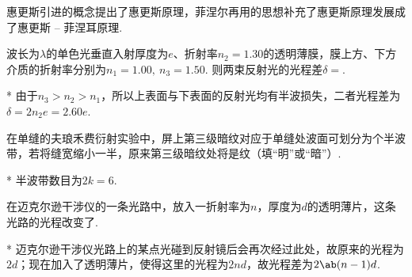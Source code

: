 \begin{problem}[惠更斯原理][4]
    惠更斯引进的概念提出了惠更斯原理，菲涅尔再用的思想补充了惠更斯原理发展成了惠更斯 -- 菲涅耳原理.
\end{problem}

\begin{problem}[增透膜][2]
    波长为$\lambda$的单色光垂直入射厚度为$e$、折射率$n_2=1.30$的透明薄膜，膜上方、下方介质的折射率分别为$n_1=1.00,\ n_3=1.50$. 则两束反射光的光程差$\delta=$.
\end{problem}
\begin{solution}*
    由于$n_3>n_2>n_1$，所以上表面与下表面的反射光均有半波损失，二者光程差为$\delta=2n_2e=2.60e$.
\end{solution}

\begin{problem}[弗琅禾费衍射][4]
    在单缝的夫琅禾费衍射实验中，屏上第三级暗纹对应于单缝处波面可划分为个半波带，若将缝宽缩小一半，原来第三级暗纹处将是纹（填“明”或“暗”）.
\end{problem}
\begin{solution}*
    半波带数目为$2k=6$.
\end{solution}

\begin{problem}[迈克尔逊干涉仪][3]
    在迈克尔逊干涉仪的一条光路中，放入一折射率为$n$，厚度为$d$的透明薄片，这条光路的光程改变了.
\end{problem}
\begin{solution}*
    迈克尔逊干涉仪光路上的某点光碰到反射镜后会再次经过此处，故原来的光程为$2d$；现在加入了透明薄片，使得这里的光程为$2nd$，故光程差为$2\ab(n-1)d$.
\end{solution}

